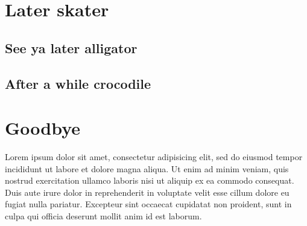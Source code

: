 \section{Later skater}

\subsection{See ya later alligator}
\subsection{After a while crocodile}

\section{Goodbye}

Lorem ipsum dolor sit amet, consectetur adipisicing elit, sed do
eiusmod tempor incididunt ut labore et dolore magna aliqua. Ut enim ad
minim veniam, quis nostrud exercitation ullamco laboris nisi ut
aliquip ex ea commodo consequat. Duis aute irure dolor in
reprehenderit in voluptate velit esse cillum dolore eu fugiat nulla
pariatur. Excepteur sint occaecat cupidatat non proident, sunt in
culpa qui officia deserunt mollit anim id est laborum.



